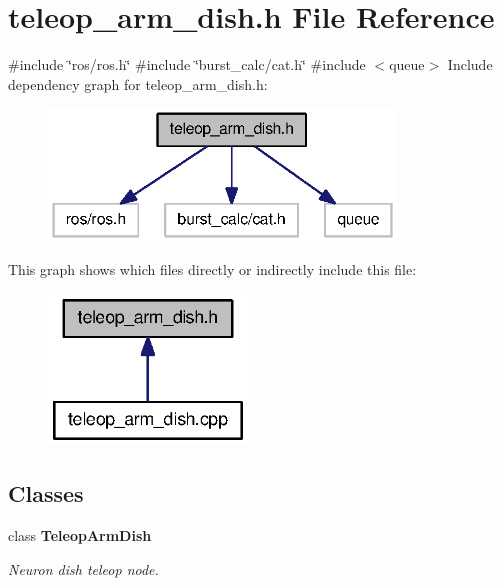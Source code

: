 \section{teleop\-\_\-arm\-\_\-dish.\-h \-File \-Reference}
\label{teleop__arm__dish_8h}
{\ttfamily \#include \char`\"{}ros/ros.\-h\char`\"{}}\*
{\ttfamily \#include \char`\"{}burst\-\_\-calc/cat.\-h\char`\"{}}\*
{\ttfamily \#include $<$queue$>$}\*
\-Include dependency graph for teleop\-\_\-arm\-\_\-dish.\-h\-:\nopagebreak
\begin{figure}[H]
\begin{center}
\leavevmode
\includegraphics[width=262pt]{teleop__arm__dish_8h__incl}
\end{center}
\end{figure}
\-This graph shows which files directly or indirectly include this file\-:\nopagebreak
\begin{figure}[H]
\begin{center}
\leavevmode
\includegraphics[width=150pt]{teleop__arm__dish_8h__dep__incl}
\end{center}
\end{figure}
\subsection*{\-Classes}
\begin{DoxyCompactItemize}
\item 
class {\bf \-Teleop\-Arm\-Dish}
\begin{DoxyCompactList}\small\item\em \-Neuron dish teleop node. \end{DoxyCompactList}\end{DoxyCompactItemize}
